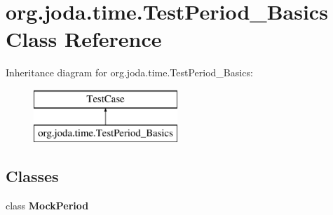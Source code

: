 \hypertarget{classorg_1_1joda_1_1time_1_1_test_period___basics}{\section{org.\-joda.\-time.\-Test\-Period\-\_\-\-Basics Class Reference}
\label{classorg_1_1joda_1_1time_1_1_test_period___basics}
}
Inheritance diagram for org.\-joda.\-time.\-Test\-Period\-\_\-\-Basics\-:\begin{figure}[H]
\begin{center}
\leavevmode
\includegraphics[height=2.000000cm]{classorg_1_1joda_1_1time_1_1_test_period___basics}
\end{center}
\end{figure}
\subsection*{Classes}
\begin{DoxyCompactItemize}
\item 
class {\bfseries Mock\-Period}
\end{DoxyCompactItemize}
